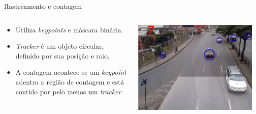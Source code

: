 \begin{frame}{Rastreamento e contagem}
  \begin{columns}[T]
    \begin{column}{.5\textwidth}
      \begin{itemize}
        \item Utiliza \textit{keypoints} e máscara binária.
        \item \textit{Tracker} é um objeto circular, definido por sua posição e raio.
        \item A contagem acontece se um \textit{keypoint} adentra a região de contagem e está contido por pelo menos um \textit{tracker}.
      \end{itemize}
    \end{column}
    \begin{column}{.5\textwidth}
      \begin{block}{}
        \includegraphics[width=\textwidth]{imgs/trackers.png}
      \end{block}{}
    \end{column}
  \end{columns}
\end{frame}

